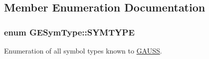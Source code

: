 \subsection{Member Enumeration Documentation}
\hypertarget{class_g_e_sym_type_a05477e08255bea70296f7825493e95fc}{
\subsubsection[{S\-Y\-M\-T\-Y\-P\-E}]{\setlength{\rightskip}{0pt plus 5cm}enum {\bf G\-E\-Sym\-Type\-::\-S\-Y\-M\-T\-Y\-P\-E}}}\label{class_g_e_sym_type_a05477e08255bea70296f7825493e95fc}


Enumeration of all symbol types known to \hyperlink{class_g_a_u_s_s}{G\-A\-U\-S\-S}. 

